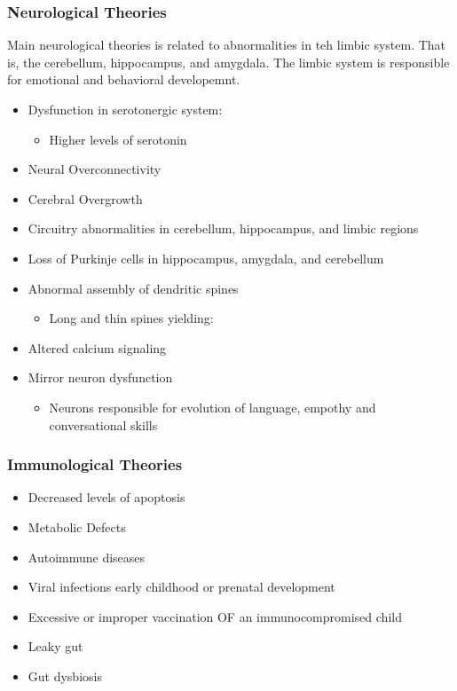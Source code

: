 \documentclass[journal, 12pt]{IEEEtran}
\begin{document}
\subsubsection{Neurological Theories}
Main neurological theories is related to abnormalities in teh limbic system. That is, the cerebellum, hippocampus, and amygdala. The limbic system is responsible for emotional and behavioral developemnt. 
\begin{itemize}
\item Dysfunction in serotonergic system: 
\begin{itemize} 
\item Higher levels of serotonin
\end{itemize}
\item Neural Overconnectivity
\item Cerebral Overgrowth
\item Circuitry abnormalities in cerebellum, hippocampus, and limbic regions
\item Loss of Purkinje cells in hippocampus, amygdala, and cerebellum
\item Abnormal assembly of dendritic spines 
\begin{itemize}
\item Long and thin spines yielding: 
\end{itemize}
\item Altered calcium signaling 
\item Mirror neuron dysfunction 
\begin{itemize}
\item Neurons responsible for evolution of language, empothy and conversational skills
\end{itemize}
\end{itemize}
\subsubsection{Immunological Theories}
\begin{itemize}
\item Decreased levels of apoptosis 
\item Metabolic Defects
\item Autoimmune diseases
\item Viral infections early childhood or prenatal development
\item Excessive or improper vaccination OF an immunocompromised child
\item Leaky gut
\item Gut dysbiosis
\end{itemize}
\end{document}
